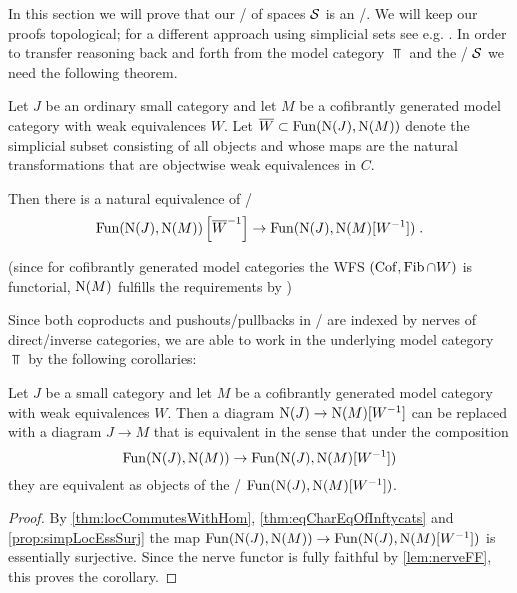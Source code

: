 In this section we will prove that our \inftycat/ of spaces $\mathcal{S}$ is an \inftytop/.
We will keep our proofs topological; for a different approach using simplicial sets see e.g. \cite[\S 6]{HTT}.
In order to transfer reasoning back and forth from the model category $\Top$ and the \inftycat/ $\mathcal{S}$ we need the following theorem. %
\begin{thm}\label{thm:locCommutesWithHom} 
    Let $J$ be an ordinary small category and let $M$ be a cofibrantly generated model category with weak equivalences $W$.
    Let $\overline{W}\subset\operatorname{Fun}(\operatorname{N}(J),\operatorname{N}(M))$ denote the simplicial subset consisting of all objects and whose maps are the natural transformations that are objectwise weak equivalences in $C$.
    
    Then there is a natural equivalence of \inftycats/
    \begin{equation*}
        \operatorname{Fun}(\operatorname{N}(J),\operatorname{N}(M))\left[\overline{W}^{-1}\right]\to\operatorname{Fun}(\operatorname{N}(J),\operatorname{N}(M)[W^{-1}])\;.
    \end{equation*} 
    \begin{reference}
        \cite[Theorem 7.9.8]{cisinski_2019} (since for cofibrantly generated model categories the WFS $(\operatorname{Cof},\operatorname{Fib}\cap W)$ is functorial, $\operatorname{N}(M)$ fulfills the requirements by \cite[Example 7.9.6]{cisinski_2019})
    \end{reference}
\end{thm}
Since both coproducts and pushouts/pullbacks in \inftycats/ are indexed by nerves of direct/inverse categories, we are able to work in the underlying model category $\Top$ by the following corollaries: %
\begin{corollary}\label{cor:replaceWithStrictDiagram}
    Let $J$ be a small category and let $M$ be a cofibrantly generated model category with weak equivalences $W$.
    Then a diagram $\operatorname{N}(J)\to\operatorname{N}(M)[W^{-1}]$ can be replaced with a diagram $J\to M$ that is equivalent in the sense that under the composition
    \begin{equation*}
        \operatorname{Fun}(\operatorname{N}(J),\operatorname{N}(M))\to\operatorname{Fun}(\operatorname{N}(J),\operatorname{N}(M)[W^{-1}])
    \end{equation*} 
    they are equivalent as objects of the \inftycat/ $\operatorname{Fun}(\operatorname{N}(J),\operatorname{N}(M)[W^{-1}])$.
    \begin{proof}
        By \cref{thm:locCommutesWithHom}, \cref{thm:eqCharEqOfInftycats} and \cref{prop:simpLocEssSurj} the map $\operatorname{Fun}(\operatorname{N}(J),\operatorname{N}(M))\to\operatorname{Fun}(\operatorname{N}(J),\operatorname{N}(M)[W^{-1}])$ is essentially surjective.
        Since the nerve functor is fully faithful by \cref{lem:nerveFF}, this proves the corollary.
    \end{proof}
\end{corollary}
